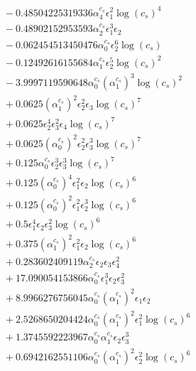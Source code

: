 \documentclass[10pt]{article}
\begin{document}
\begin{align*}
&{}  - 0.48504225319336 \alpha_{4}^{c_s} \epsilon_{1}^{2} \log{\left(c_{s} \right)}^{4} \\
&{}  - 0.48902152953593 \alpha_{2}^{c_s} \epsilon_{1}^{3} \epsilon_{2} \\
&{}  - 0.062454513450476 \alpha_{0}^{c_s} \epsilon_{2}^{6} \log{\left(c_{s} \right)} \\
&{}  - 0.12492616155684 \alpha_{1}^{c_s} \epsilon_{2}^{5} \log{\left(c_{s} \right)}^{2} \\
&{}  - 3.9997119590648 \alpha_{0}^{c_s} \left(\alpha_{1}^{c_s}\right)^{3} \log{\left(c_{s} \right)}^{2} \\
&{}  + 0.0625 \left(\alpha_{1}^{c_s}\right)^{2} \epsilon_{2}^{2} \epsilon_{3} \log{\left(c_{s} \right)}^{7} \\
&{}  + 0.0625 \epsilon_{2}^{4} \epsilon_{3}^{2} \epsilon_{4} \log{\left(c_{s} \right)}^{7} \\
&{}  + 0.0625 \left(\alpha_{0}^{c_s}\right)^{2} \epsilon_{2}^{2} \epsilon_{3}^{3} \log{\left(c_{s} \right)}^{7} \\
&{}  + 0.125 \alpha_{0}^{c_s} \epsilon_{2}^{3} \epsilon_{3}^{3} \log{\left(c_{s} \right)}^{7} \\
&{}  + 0.125 \left(\alpha_{0}^{c_s}\right)^{4} \epsilon_{1}^{2} \epsilon_{2} \log{\left(c_{s} \right)}^{6} \\
&{}  + 0.125 \left(\alpha_{0}^{c_s}\right)^{2} \epsilon_{1}^{2} \epsilon_{2}^{3} \log{\left(c_{s} \right)}^{6} \\
&{}  + 0.5 \epsilon_{1}^{4} \epsilon_{2} \epsilon_{3}^{2} \log{\left(c_{s} \right)}^{6} \\
&{}  + 0.375 \left(\alpha_{1}^{c_s}\right)^{2} \epsilon_{1}^{2} \epsilon_{2} \log{\left(c_{s} \right)}^{6} \\
&{}  + 0.283602409119 \alpha_{2}^{c_s} \epsilon_{2} \epsilon_{3} \epsilon_{4}^{2} \\
&{}  + 17.090054153866 \alpha_{0}^{c_s} \epsilon_{1}^{3} \epsilon_{2} \epsilon_{3}^{2} \\
&{}  + 8.9966276756045 \alpha_{0}^{c_s} \left(\alpha_{1}^{c_s}\right)^{2} \epsilon_{1} \epsilon_{2} \\
&{}  + 2.5268650204424 \alpha_{0}^{c_s} \left(\alpha_{1}^{c_s}\right)^{2} \epsilon_{1}^{2} \log{\left(c_{s} \right)}^{6} \\
&{}  + 1.3745592223967 \alpha_{0}^{c_s} \alpha_{1}^{c_s} \epsilon_{2} \epsilon_{3}^{3} \\
&{}  + 0.6942162551106 \alpha_{0}^{c_s} \left(\alpha_{1}^{c_s}\right)^{2} \epsilon_{2}^{2} \log{\left(c_{s} \right)}^{6} \\

\end{align*}
\end{document}
